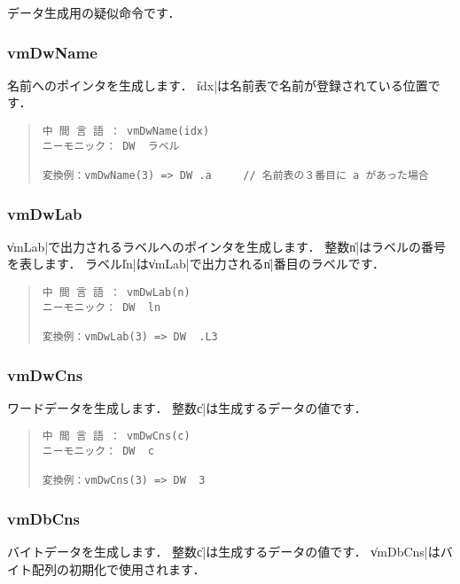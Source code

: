 データ生成用の疑似命令です．

\subsubsection{vmDwName}

名前へのポインタを生成します．
\|idx|は名前表で名前が登録されている位置です．

\begin{quote}
\begin{verbatim}
中 間 言 語 ： vmDwName(idx)
ニーモニック： DW  ラベル

変換例：vmDwName(3) => DW .a     // 名前表の３番目に a があった場合
\end{verbatim}
\end{quote}

\subsubsection{vmDwLab}

\|vmLab|で出力されるラベルへのポインタを生成します．
整数\|n|はラベルの番号を表します．
ラベル\|ln|は\|vmLab|で出力される\|n|番目のラベルです．

\begin{quote}
\begin{verbatim}
中 間 言 語 ： vmDwLab(n)
ニーモニック： DW  ln   

変換例：vmDwLab(3) => DW  .L3
\end{verbatim}
\end{quote}

\subsubsection{vmDwCns}

ワードデータを生成します．
整数\|c|は生成するデータの値です．

\begin{quote}
\begin{verbatim}
中 間 言 語 ： vmDwCns(c)
ニーモニック： DW  c   

変換例：vmDwCns(3) => DW  3
\end{verbatim}
\end{quote}

\subsubsection{vmDbCns}

バイトデータを生成します．
整数\|c|は生成するデータの値です．
\|vmDbCns|はバイト配列の初期化で使用されます．

